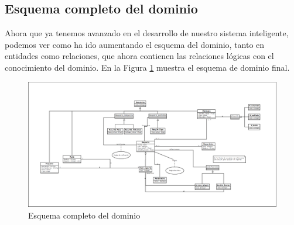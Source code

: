 \subsection{Esquema completo del dominio}
Ahora que ya tenemos avanzado en el desarrollo de nuestro sistema inteligente, podemos ver como ha ido aumentando el esquema del dominio, tanto en entidades como relaciones, que ahora contienen las relaciones lógicas con el conocimiento del dominio. En la Figura \ref{fig:DominioCompleto} muestra el esquema de dominio final.

\begin{figure}[H]
  \centering
  \includegraphics[scale=0.25,angle=90]{imaxes/Diagrama_Dominio_Completo.png}
  \caption{\label{fig:DominioCompleto}Esquema completo del dominio}
\end{figure}
